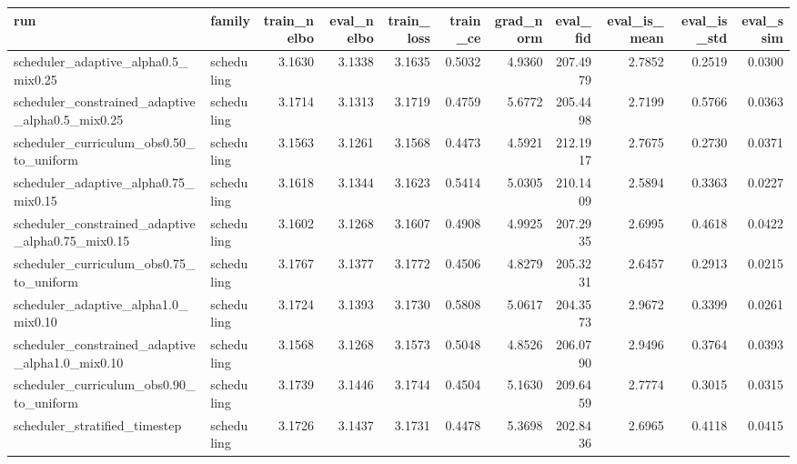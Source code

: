 \begin{tabular}{llrrrrrrrrr}
\toprule
run & family & train_nelbo & eval_nelbo & train_loss & train_ce & grad_norm & eval_fid & eval_is_mean & eval_is_std & eval_ssim \\
\midrule
scheduler_adaptive_alpha0.5_mix0.25 & scheduling & 3.1630 & 3.1338 & 3.1635 & 0.5032 & 4.9360 & 207.4979 & 2.7852 & 0.2519 & 0.0300 \\
scheduler_constrained_adaptive_alpha0.5_mix0.25 & scheduling & 3.1714 & 3.1313 & 3.1719 & 0.4759 & 5.6772 & 205.4498 & 2.7199 & 0.5766 & 0.0363 \\
scheduler_curriculum_obs0.50_to_uniform & scheduling & 3.1563 & 3.1261 & 3.1568 & 0.4473 & 4.5921 & 212.1917 & 2.7675 & 0.2730 & 0.0371 \\
scheduler_adaptive_alpha0.75_mix0.15 & scheduling & 3.1618 & 3.1344 & 3.1623 & 0.5414 & 5.0305 & 210.1409 & 2.5894 & 0.3363 & 0.0227 \\
scheduler_constrained_adaptive_alpha0.75_mix0.15 & scheduling & 3.1602 & 3.1268 & 3.1607 & 0.4908 & 4.9925 & 207.2935 & 2.6995 & 0.4618 & 0.0422 \\
scheduler_curriculum_obs0.75_to_uniform & scheduling & 3.1767 & 3.1377 & 3.1772 & 0.4506 & 4.8279 & 205.3231 & 2.6457 & 0.2913 & 0.0215 \\
scheduler_adaptive_alpha1.0_mix0.10 & scheduling & 3.1724 & 3.1393 & 3.1730 & 0.5808 & 5.0617 & 204.3573 & 2.9672 & 0.3399 & 0.0261 \\
scheduler_constrained_adaptive_alpha1.0_mix0.10 & scheduling & 3.1568 & 3.1268 & 3.1573 & 0.5048 & 4.8526 & 206.0790 & 2.9496 & 0.3764 & 0.0393 \\
scheduler_curriculum_obs0.90_to_uniform & scheduling & 3.1739 & 3.1446 & 3.1744 & 0.4504 & 5.1630 & 209.6459 & 2.7774 & 0.3015 & 0.0315 \\
scheduler_stratified_timestep & scheduling & 3.1726 & 3.1437 & 3.1731 & 0.4478 & 5.3698 & 202.8436 & 2.6965 & 0.4118 & 0.0415 \\
\bottomrule
\end{tabular}
